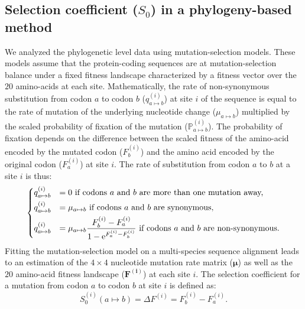 \documentclass{article}
\newcommand{\UniDimArray}[1]{\bm{#1}}
\newcommand{\e}{\text{e}}
\newcommand{\proba}{\mathbb{P}}
\newcommand{\Sphy}{S_{0}}
\begin{document}
    \subsection{Selection coefficient ($\Sphy$) in a phylogeny-based method}
    \label{subsec:s-phylogeny-method}
    We analyzed the phylogenetic level data using mutation-selection models.
    These models assume that the protein-coding sequences are at mutation-selection balance under a fixed fitness landscape characterized by a fitness vector over the $20$ amino-acids at each site\cite{yang_mutationselection_2008, halpern_evolutionary_1998, rodrigue_mechanistic_2010}.
    Mathematically, the rate of non-synonymous substitution from codon $a$ to codon $b$ ($q_{a \mapsto b}^{(i)}$) at site $i$ of the sequence is equal to the rate of mutation of the underlying nucleotide change ($\mu_{a \mapsto b}$) multiplied by the scaled probability of fixation of the mutation ($\proba_{a \mapsto b}^{(i)}$).
    The probability of fixation depends on the difference between the scaled fitness of the amino-acid encoded by the mutated codon ($F_b^{(i)}$) and the amino acid encoded by the original codon ($F_a^{(i)}$) at site $i$\cite{wright_evolution_1931, fisher_genetical_1930}.
    The rate of substitution from codon $a$ to $b$ at a site $i$ is thus:
    \begin{equation}
        \begin{dcases}
            q_{a \mapsto b}^{(i)} & = 0 \text{ if codons $a$ and $b$ are more than one mutation away,} \\
            q_{a \mapsto b}^{(i)} & = \mu_{a \mapsto b} \text{ if codons $a$ and $b$ are synonymous,} \\
            q_{a \mapsto b}^{(i)} & = \mu_{a \mapsto b} \dfrac{F_b^{(i)} - F_a^{(i)}}{1 - \e^{F_a^{(i)} - F_b^{(i)}}} \text{ if codons $a$ and $b$ are non-synonymous}.
        \end{dcases}
    \end{equation}
    Fitting the mutation-selection model on a multi-species sequence alignment leads to an estimation of the $4 \times 4$ nucleotide mutation rate matrix ($\UniDimArray{\mu}$) as well as the $20$ amino-acid fitness landscape ($\UniDimArray{F^{(i)}}$) at each site $i$.
    The selection coefficient for a mutation from codon $a$ to codon $b$ at site $i$ is defined as:
    \begin{equation}
        \Sphy^{(i)} (a \mapsto b) = \Delta F^{(i)} = F^{(i)}_{b} - F^{(i)}_{a}.
    \end{equation}
\end{document}
